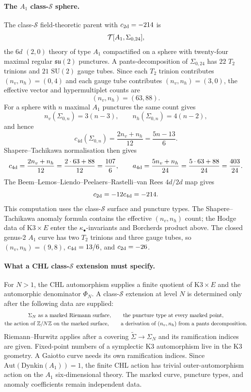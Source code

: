\paragraph{The \(A_1\) class-\(\mathcal{S}\) sphere.}
The class-\(\mathcal{S}\) field-theoretic parent with
\(c_{\mathrm{2d}}=-214\) is
\[
  \mathcal{T}[A_1,\Sigma_{0,24}],
\]
the \(6d\) \((2,0)\) theory of type \(A_1\) compactified on a sphere with
twenty-four maximal regular \(\mathfrak{su}(2)\) punctures.  A
pants-decomposition of \(\Sigma_{0,24}\) has \(22\) \(T_2\) trinions
and \(21\) \(\mathrm{SU}(2)\) gauge tubes.  Since each \(T_2\) trinion
contributes \((n_v,n_h)=(0,4)\) and each gauge tube contributes
\((n_v,n_h)=(3,0)\), the effective vector and hypermultiplet counts are
\[
  (n_v,n_h)=(63,88).
\]
For a sphere with \(n\) maximal \(A_1\) punctures the same count gives
\[
  n_v(\Sigma_{0,n})=3(n-3),\qquad
  n_h(\Sigma_{0,n})=4(n-2),
\]
and hence
\[
  c_{\mathrm{4d}}(\Sigma_{0,n})
  =\frac{2n_v+n_h}{12}
  =\frac{5n-13}{6}.
\]
Shapere--Tachikawa normalisation then gives
\[
  c_{\mathrm{4d}}=\frac{2n_v+n_h}{12}
       =\frac{2\cdot 63+88}{12}
       =\frac{107}{6},
  \qquad
  a_{\mathrm{4d}}=\frac{5n_v+n_h}{24}
       =\frac{5\cdot 63+88}{24}
       =\frac{403}{24}.
\]
The Beem--Lemos--Liendo--Peelaers--Rastelli--van Rees
\(4d/2d\) map gives
\[
  c_{\mathrm{2d}}=-12c_{\mathrm{4d}}=-214 .
\]
This computation uses the class-\(\mathcal{S}\) surface and puncture
types.  The Shapere--Tachikawa anomaly formula contains the effective
\((n_v,n_h)\) count; the Hodge data of \(\mathrm{K3}\times E\) enter the
\(\kappa_\bullet\)-invariants and Borcherds product above.  The closed
genus-\(2\) \(A_1\) curve has two \(T_2\) trinions and three gauge tubes,
so \((n_v,n_h)=(9,8)\), \(c_{\mathrm{4d}}=13/6\), and \(c_{\mathrm{2d}}=-26\).

\paragraph{What a CHL class-\(\mathcal{S}\) extension must specify.}
For \(N>1\), the CHL automorphism supplies a finite quotient of
\(\mathrm{K3}\times E\) and the automorphic denominator \(\Phi_N\).  A
class-\(\mathcal{S}\) extension at level \(N\) is determined only after
the following data are supplied:
\[
\begin{gathered}
  \Sigma_N\ \text{as a marked Riemann surface},\qquad
  \text{the puncture type at every marked point},\\
  \text{the action of }\mathbb{Z}/N\mathbb{Z}\text{ on the marked surface},\qquad
  \text{a derivation of }(n_v,n_h)\text{ from a pants decomposition}.
\end{gathered}
\]
Riemann--Hurwitz applies after a covering
\(\widetilde{\Sigma}\to\Sigma_N\) and its ramification indices are
given.  Fixed-point numbers of a symplectic K3 automorphism live in the
K3 geometry. A Gaiotto curve needs its own ramification indices.
Since \(\mathrm{Aut}(\mathrm{Dynkin}(A_1))=1\), the finite CHL action
has trivial outer-automorphism action on the \(A_1\) six-dimensional
theory. The marked curve, puncture types, and anomaly coefficients
remain independent data.

